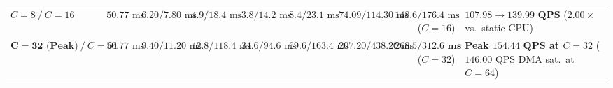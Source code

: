\documentclass[10pt,a4paper]{article}
\begin{document}
\begin{table}[htbp]
\begin{tabular}{@{}llrrrrrrl@{}}
$C=8\ /\ C=16$ & $50.77\text{ ms}$ & $6.20 / 7.80\text{ ms}$ & $4.9 / 18.4\text{ ms}$ & $3.8 / 14.2\text{ ms}$ & $8.4 / 23.1\text{ ms}$ & $74.09 / 114.30\text{ ms}$ & $148.6 / 176.4\text{ ms}$ ($C=16$) & $\mathbf{107.98\rightarrow 139.99\text{ QPS}}$ ($2.00\times$ vs.\ static CPU) \\
$\mathbf{C=32\text{ (Peak)}}\ /\ C=64$ & $50.77\text{ ms}$ & $\mathbf{9.40} / 11.20\text{ ms}$ & $\mathbf{42.8} / 118.4\text{ ms}$ & $\mathbf{34.6} / 94.6\text{ ms}$ & $\mathbf{69.6} / 163.4\text{ ms}$ & $\mathbf{207.20} / 438.20\text{ ms}$ & $\mathbf{268.5 / 312.6\text{ ms}}$ ($C=32$) & \textbf{Peak $\mathbf{154.44\text{ QPS}}$ at $C=32$} ($146.00\text{ QPS}$ DMA sat.\ at $C=64$) \\
\bottomrule
\end{tabular}
\end{table}
\end{document}
